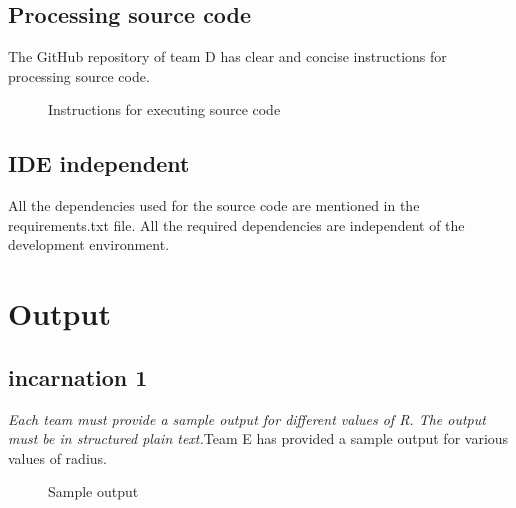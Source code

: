 \subsection{Processing source code}
\begin{flushleft}
    The GitHub repository of team D has clear and concise instructions for processing source code.
    \begin{figure}[h!]
        \centering
        \vspace{.5cm}
        \caption{Instructions for executing source code}
        \label{fig:run instructions }
    \end{figure}
\end{flushleft}
\subsection{IDE independent}
\begin{flushleft}
    All the dependencies used for the source code are mentioned in the requirements.txt file. All the required dependencies are independent of the development environment.
\end{flushleft}
  \section{Output}
  \subsection{incarnation 1}
  \begin{flushleft}
    \textit{Each team must provide a sample output for different values of R. The output must be in structured plain text.}\newline Team E has provided a sample output for various values of radius.
  \end{flushleft}
  \begin{figure}[h!]
    \centering
    \vspace{.5cm}
    \caption{Sample output}
    \label{fig:cos }
  \end{figure}
